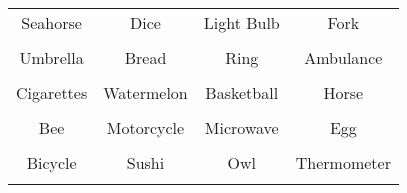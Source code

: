 \documentclass[12pt,a4paper]{article}
\begin{document}
\thispagestyle{empty}
\begin{table}[]
\centering
\Huge
\begin{tabular}{cccc}
 Seahorse& Dice& Light Bulb& Fork\\  & & & \\
 Umbrella& Bread& Ring& Ambulance\\  & & & \\
 Cigarettes& Watermelon& Basketball& Horse\\  & & & \\
 Bee& Motorcycle& Microwave& Egg\\  & & & \\
 Bicycle& Sushi& Owl& Thermometer\\  & & & \\
\end{tabular}
\end{table}
\end{document}
